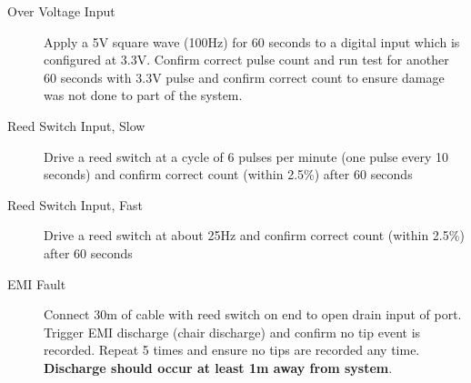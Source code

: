 \begin{description}
\item [Over Voltage Input] Apply a 5V square wave (100Hz) for 60 seconds to a digital input which is configured at 3.3V. Confirm correct pulse count and run test for another 60 seconds with 3.3V pulse and confirm correct count to ensure damage was not done to part of the system. 
\item [Reed Switch Input, Slow] Drive a reed switch at a cycle of 6 pulses per minute (one pulse every 10 seconds) and confirm correct count (within 2.5\%) after 60 seconds
\item [Reed Switch Input, Fast] Drive a reed switch at about 25Hz and confirm correct count (within 2.5\%) after 60 seconds
\item [EMI Fault] Connect 30m of cable with reed switch on end to open drain input of port. Trigger EMI discharge (chair discharge) and confirm no tip event is recorded. Repeat 5 times and ensure no tips are recorded any time. \textbf{Discharge should occur at least 1m away from system}.
\end{description}



